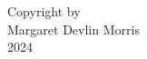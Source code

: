 


\begin{center}
\null
\vfill
\begin{doublespace}
Copyright by \\ 
Margaret Devlin Morris \\ 
2024 \\
\end{doublespace}
\end{center}
